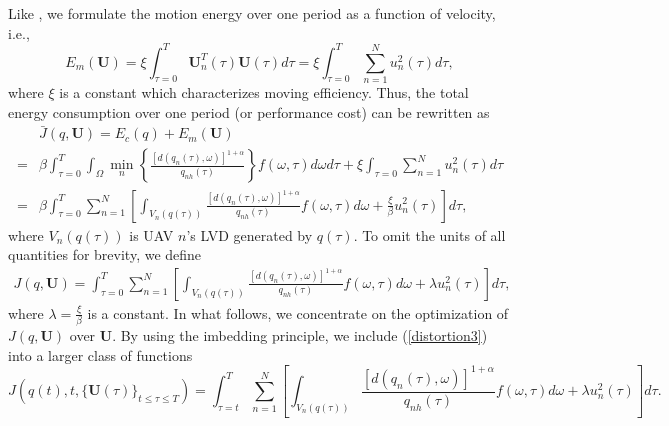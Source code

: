 \documentclass[smallabstract,smallcaptions]{dccpaper}
\newcommand{\bU}{\mathbf{U}}
\newcommand{\bP}{\ensuremath{\vp}}          %
\newcommand{\bQ}{\ensuremath{q}}          %
\newcommand{\bH}{\ensuremath{\vh}}          %
\begin{document}
Like \cite{ML,MLCS}, we formulate the motion energy over one period as a function of velocity, i.e., 
\begin{equation}
E_m\left(\mathbf{U}\right)=\xi\int_{\tau=0}^{T}\bU^T_n(\tau)\bU(\tau)d\tau=\xi\int_{\tau=0}^{T}\sum_{n=1}^{N}u^2_n(\tau)d\tau,
\end{equation}
where $\xi$ is a constant which characterizes moving efficiency. 
Thus, the total energy consumption over one period (or performance cost) can be rewritten as
\begin{equation}
\begin{aligned}
&\bar{J}\left(\bQ,\bU\right) {=} E_c\left(\bQ\right) + E_m\left(\mathbf{U}\right)\\
{=}& \beta\int_{\tau=0}^{T}\int_{\Omega}\min_{n}\left\{\frac{\left[d\left(q_n(\tau),\omega\right)\right]^{1+\alpha}}{q_{nh}\left(\tau\right)}\right\}f\left(\omega,\tau\right)d\omega d\tau + \xi\int_{\tau=0}\sum_{n=1}^{N}u^2_n(\tau)d\tau\\
{=}&\beta\int_{\tau=0}^{T}\sum_{n=1}^{N}\left[\int_{V_n\left(\bQ(\tau)\right)}\frac{\left[d\left(q_n(\tau),\omega\right)\right]^{1+\alpha}}{q_{nh}\left(\tau\right)}f\left(\omega,\tau\right)d\omega + \frac{\xi}{\beta} u^2_n(\tau) \right] d\tau,
\end{aligned}
\label{distortion2}
\end{equation}
where $V_n\left(\bQ(\tau)\right)$ is UAV $n$'s LVD generated by $\bQ\left(\tau\right)$.
To omit the units of all quantities for brevity, we define
\begin{equation}
\begin{aligned}
J\left(\bQ,\bU\right)
{=}\int_{\tau=0}^{T}\sum_{n=1}^{N}\left[\int_{V_n\left(\bQ(\tau)\right)}\frac{\left[d\left(q_n(\tau),\omega\right)\right]^{1+\alpha}}{q_{nh}\left(\tau\right)}f\left(\omega,\tau\right)d\omega + \lambda u^2_n(\tau) \right] d\tau,
\end{aligned}
\label{distortion3}
\end{equation}
where $\lambda=\frac{\xi}{\beta}$ is a constant.
In what follows, we concentrate on the optimization of $J\left(\bQ,\bU\right)$ over $\bU$.
By using the imbedding principle, we include (\ref{distortion3}) into a larger class of functions \cite{KD}
\begin{equation}
J\!\left(\bQ(t), t, \{\bU(\tau)\}_{t\le\tau\le T}\right) =\! \int_{\tau=t}^{T}\sum_{n=1}^{N}\left[\int_{V_n\left(\bQ(\tau)\right)}\!\!\!\!\frac{\left[d\left(q_n(\tau),\omega\right)\right]^{1+\alpha}}{q_{nh}\left(\tau\right)}f\left(\omega,\tau\right)d\omega + \lambda u^2_n(\tau) \right] d\tau.
\label{Jt}
\end{equation}
\end{document}
